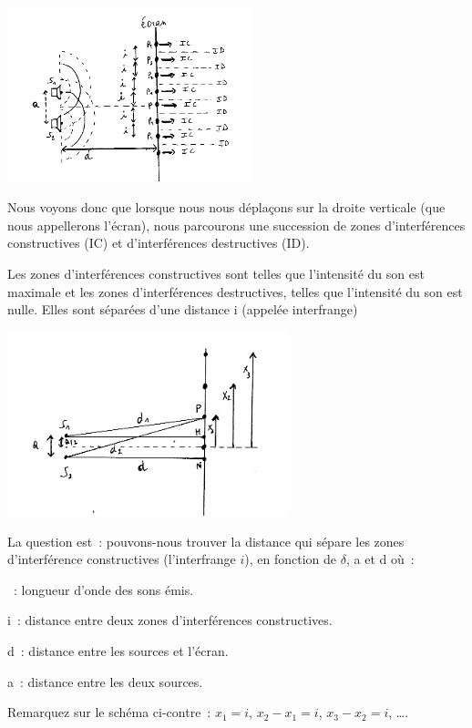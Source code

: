 \includegraphics[width=7.086cm,height=5.068cm]{Pictures/10000001000001CB00000148F2D7DB2B0F2EC580.png}

Nous
voyons donc que lorsque nous nous déplaçons sur la droite verticale (que
nous appellerons l'écran), nous parcourons une succession de zones
d'interférences constructives (IC) et d'interférences destructives (ID).

Les zones d'interférences constructives sont telles que l'intensité du
son est maximale et les zones d'interférences destructives, telles que
l'intensité du son est nulle. Elles sont séparées d'une distance i
(appelée interfrange)

\includegraphics[width=8.123cm,height=5.352cm]{Pictures/100000010000018B00000104CBB3B40EFC3646D7.png}

La question est~: pouvons-nous trouver la distance qui sépare les zones
d'interférence constructives (l'interfrange $i$), en fonction de
$\delta$, a et d où~: 

\begin{description}
 \item{\delta}~: longueur d'onde des sons émis.
 \item{i}~: distance entre deux zones d'interférences constructives.
 \item{d}~: distance entre les sources et l'écran.
 \item{a}~: distance entre les deux sources.
\end{description}

Remarquez sur le schéma ci-contre~: $x_{1}=i$,
$x_{2}-x_{1} = i$,
$x_{3}-x_{2} = i$, \ldots.

